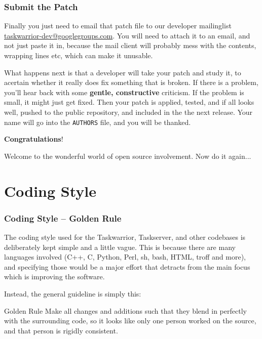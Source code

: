 \documentclass[t,handout]{beamer}
\begin{document}
\begin{frame}[fragile]\frametitle{Submit the Patch}
    Finally you just need to email that patch file to our developer mailinglist \href{mailto:taskwarrior-dev@googlegroups.com}{taskwarrior-dev@googlegroups.com}. You will need to attach it to an email, and not just paste it in, because the mail client will probably mess with the contents, wrapping lines etc, which can make it unusable.

    What happens next is that a developer will take your patch and study it, to acertain whether it really does fix something that is broken. If there is a problem, you'll hear back with some \textbf{gentle, constructive} criticism. If the problem is small, it might just get fixed. Then your patch is applied, tested, and if all looks well, pushed to the public repository, and included in the the next release. Your name will go into the \verb=AUTHORS= file, and you will be thanked.

    \textbf{Congratulations}!

    Welcome to the wonderful world of open source involvement. Now do it again...
\end{frame}

\section{Coding Style}

\begin{frame}[fragile]\frametitle{Coding Style -- Golden Rule}
    The coding style used for the Taskwarrior, Taskserver, and other codebases is deliberately kept simple and a little vague. This is because there are many languages involved (C++, C, Python, Perl, sh, bash, HTML, troff and more), and specifying those would be a major effort that detracts from the main focus which is improving the software.

    Instead, the general guideline is simply this:

    \begin{alertblock}{Golden Rule}
        Make all changes and additions such that they blend in perfectly with the surrounding code, so it looks like only one person worked on the source, and that person is rigidly consistent.
    \end{alertblock}

\end{frame}
\end{document}
